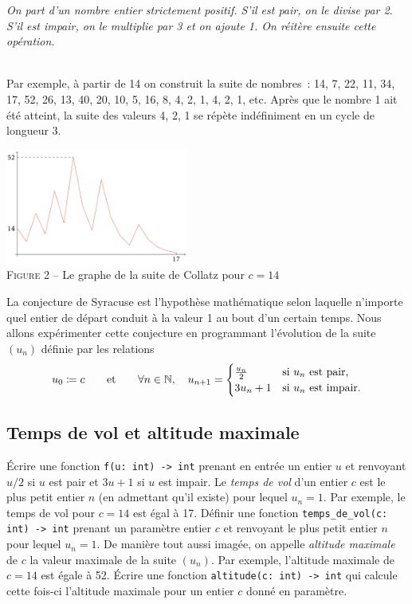 \documentclass{magnolia}
\begin{document}
\parbox[c]{0.92\linewidth}{\emph{On part d'un nombre entier strictement positif. S'il est pair,
on le divise par 2. S'il est impair, on le multiplie par 3 et on ajoute 1. On réitère ensuite
cette opération.}}\\

Par exemple, à partir de 14 on construit la suite de nombres~: 14, 7, 22, 11, 34, 17, 52, 26,
13, 40, 20, 10, 5, 16, 8, 4, 2, 1, 4, 2, 1, etc. Après que le nombre 1 ait été atteint, la suite
des valeurs 4, 2, 1 se répète indéfiniment en un cycle de longueur 3.

\begin{center}
\includegraphics[width=0.45\textwidth]{../../Commun/Images/python-tp-collatz}\\
\textsc{Figure 2} -- Le graphe de la suite de Collatz pour $c=14$
\end{center}

La conjecture de Syracuse est l'hypothèse mathématique selon laquelle n'importe quel entier
de départ conduit à la valeur 1 au bout d'un certain temps. Nous allons expérimenter cette
conjecture en programmant l'évolution de la suite $(u_n)$ définie par les relations
\[u_0\coloneqq c\qquad\text{et}\qquad \forall n\in\mathbb{N},\quad
  u_{n+1}=\begin{cases}\frac{u_n}{2} & \text{si $u_n$ est pair,}\\ 3u_n+1 & \text{si $u_n$ est impair.}\end{cases}\]

\subsection{Temps de vol et altitude maximale}

\begin{questions}
\question Écrire une fonction \verb!f(u: int) -> int! prenant en entrée un entier $u$ et renvoyant
  $u/2$ si $u$ est pair et $3u+1$ si $u$ est impair.
\enonce Le \emph{temps de vol} d'un entier $c$ est le plus petit entier $n$ (en admettant qu'il existe) pour lequel
  $u_n=1$. Par exemple, le temps de vol pour $c=14$ est égal à 17.
\question Définir une fonction \verb!temps_de_vol(c: int) -> int! prenant un paramètre entier $c$ et renvoyant
  le plus petit entier $n$ pour lequel $u_n=1$.
\enonce De manière tout aussi imagée, on appelle \emph{altitude maximale} de $c$ la valeur maximale de la suite $(u_n)$.
  Par exemple, l'altitude maximale de $c=14$ est égale à 52.
\question Écrire une fonction \verb!altitude(c: int) -> int! qui calcule cette fois-ci l'altitude maximale pour un
  entier $c$ donné en paramètre.
\end{questions}
\end{document}
